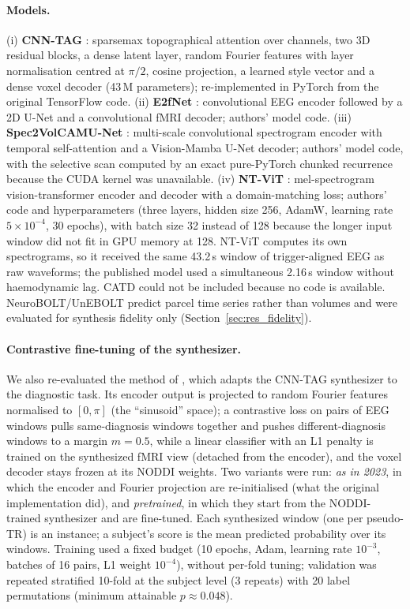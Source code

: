 \documentclass[11pt]{article}
\begin{document}
\paragraph{Models.}
(i) \textbf{CNN-TAG} \citep{calhas2023mlhc}: sparsemax topographical attention over channels, two 3D residual blocks, a dense latent layer, random Fourier features with layer normalisation centred at $\pi/2$, cosine projection, a learned style vector and a dense voxel decoder (43\,M parameters); re-implemented in PyTorch from the original TensorFlow code.
(ii) \textbf{E2fNet} \citep{roos2025e2fnet}: convolutional EEG encoder followed by a 2D U-Net and a convolutional fMRI decoder; authors' model code.
(iii) \textbf{Spec2VolCAMU-Net} \citep{he2025spec2vol}: multi-scale convolutional spectrogram encoder with temporal self-attention and a Vision-Mamba U-Net decoder; authors' model code, with the selective scan computed by an exact pure-PyTorch chunked recurrence because the CUDA kernel was unavailable.
(iv) \textbf{NT-ViT} \citep{lanzino2024ntvit}: mel-spectrogram vision-transformer encoder and decoder with a domain-matching loss; authors' code and hyperparameters (three layers, hidden size 256, AdamW, learning rate $5\times10^{-4}$, 30 epochs), with batch size 32 instead of 128 because the longer input window did not fit in GPU memory at 128. NT-ViT computes its own spectrograms, so it received the same 43.2\,s window of trigger-aligned EEG as raw waveforms; the published model used a simultaneous 2.16\,s window without haemodynamic lag.
CATD \citep{yao2025catd} could not be included because no code is available. NeuroBOLT/UnEBOLT \citep{li2024neurobolt,li2026unebolt} predict parcel time series rather than volumes and were evaluated for synthesis fidelity only (Section~\ref{sec:res_fidelity}).

\paragraph{Contrastive fine-tuning of the synthesizer.}
We also re-evaluated the method of \citet{calhas2023medrxiv}, which adapts the CNN-TAG synthesizer to the diagnostic task.
Its encoder output is projected to random Fourier features normalised to $[0,\pi]$ (the ``sinusoid'' space); a contrastive loss on pairs of EEG windows pulls same-diagnosis windows together and pushes different-diagnosis windows to a margin $m=0.5$, while a linear classifier with an L1 penalty is trained on the synthesized fMRI view (detached from the encoder), and the voxel decoder stays frozen at its NODDI weights.
Two variants were run: \emph{as in 2023}, in which the encoder and Fourier projection are re-initialised (what the original implementation did), and \emph{pretrained}, in which they start from the NODDI-trained synthesizer and are fine-tuned.
Each synthesized window (one per pseudo-TR) is an instance; a subject's score is the mean predicted probability over its windows.
Training used a fixed budget (10 epochs, Adam, learning rate $10^{-3}$, batches of 16 pairs, L1 weight $10^{-4}$), without per-fold tuning; validation was repeated stratified 10-fold at the subject level (3 repeats) with 20 label permutations (minimum attainable $p\approx0.048$).
\end{document}
